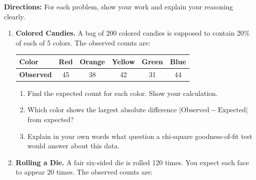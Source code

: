 \documentclass[10pt]{article}
\begin{document}
\namedateperiod

\vspace{0.1in}
\textbf{Directions:} For each problem, show your work and explain your reasoning clearly.

\begin{enumerate}

  \item \textbf{Colored Candies.} A bag of 200 colored candies is supposed to contain
        20\% of each of 5 colors. The observed counts are:

        \vspace{0.05in}
        \renewcommand{\arraystretch}{1.3}
        \begin{tabularx}{0.75\linewidth}{Xccccc}
            \textbf{Color}    & Red & Orange & Yellow & Green & Blue \\
            \hline
            \textbf{Observed} & 45  & 38     & 42     & 31    & 44   \\
        \end{tabularx}

        \begin{enumerate}[label=\alph*.]
          \item Find the expected count for each color. Show your calculation.

          \item Which color shows the largest absolute difference
                $|\text{Observed} - \text{Expected}|$ from expected?

          \item Explain in your own words what question a chi-square goodness-of-fit
                test would answer about this data.
        \end{enumerate}

  \item \textbf{Rolling a Die.} A fair six-sided die is rolled 120 times. You expect
        each face to appear 20 times. The observed counts are:


\end{enumerate}
\end{document}

